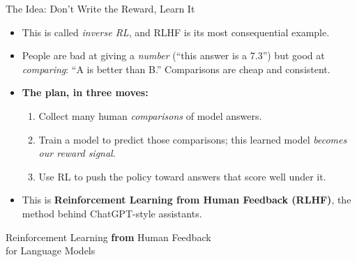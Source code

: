 \begin{frame}{The Idea: Don't Write the Reward, Learn It}
\begin{itemize}\itemsep0.45em
    \item {} This is
          called \emph{inverse RL}, and RLHF is its most consequential example.
    \item People are bad at giving a \emph{number} (``this answer is a 7.3'') but
          good at \emph{comparing}: ``A is better than B.'' Comparisons are cheap
          and consistent.
    \item \textbf{The plan, in three moves:}
    \begin{enumerate}\footnotesize\itemsep0.2em
        \item Collect many human \emph{comparisons} of model answers.
        \item Train a model to predict those comparisons; this learned model
              \emph{becomes our reward signal}.
        \item Use RL to push the policy toward answers that score well under it.
    \end{enumerate}
    \item This is \textbf{Reinforcement Learning from Human Feedback (RLHF)}, the
          method behind ChatGPT-style assistants.
\end{itemize}
\end{frame}

\begin{frame}{}
\vfill
\centering
{\LARGE Reinforcement Learning \textbf{from} Human Feedback}\\[0.4em]
{\large for Language Models}
\vfill
\end{frame}

